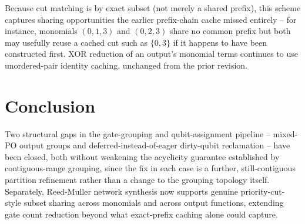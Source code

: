 \documentclass[conference]{IEEEtran}
\begin{document}
Because cut matching is by exact subset (not merely a shared prefix),
this scheme captures sharing opportunities the earlier prefix-chain
cache missed entirely -- for instance, monomials $(0,1,3)$ and
$(0,2,3)$ share no common prefix but both may usefully reuse a cached
cut such as $\{0,3\}$ if it happens to have been constructed first.
XOR reduction of an output's monomial terms continues to use
unordered-pair identity caching, unchanged from the prior revision.

\section{Conclusion}

Two structural gaps in the gate-grouping and qubit-assignment pipeline
-- mixed-PO output groups and deferred-instead-of-eager dirty-qubit
reclamation -- have been closed, both without weakening the acyclicity
guarantee established by contiguous-range grouping, since the fix in
each case is a further, still-contiguous partition refinement rather
than a change to the grouping topology itself. Separately, Reed-Muller
network synthesis now supports genuine priority-cut-style subset
sharing across monomials and across output functions, extending gate
count reduction beyond what exact-prefix caching alone could capture.
\end{document}
